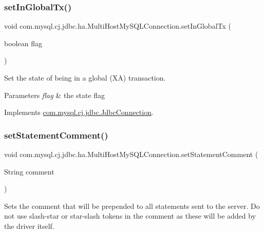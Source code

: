 \subsubsection{\texorpdfstring{set\+In\+Global\+Tx()}{setInGlobalTx()}}
{\footnotesize\ttfamily void com.\+mysql.\+cj.\+jdbc.\+ha.\+Multi\+Host\+My\+S\+Q\+L\+Connection.\+set\+In\+Global\+Tx (\begin{DoxyParamCaption}\item[{boolean}]{flag }\end{DoxyParamCaption})}

Set the state of being in a global (XA) transaction.


\begin{DoxyParams}{Parameters}
{\em flag} & the state flag \\
\hline
\end{DoxyParams}


Implements \mbox{\hyperlink{interfacecom_1_1mysql_1_1cj_1_1jdbc_1_1_jdbc_connection_af7cff3ba67d2b787b04c3eff40f9e087}{com.\+mysql.\+cj.\+jdbc.\+Jdbc\+Connection}}.

\mbox{\label{classcom_1_1mysql_1_1cj_1_1jdbc_1_1ha_1_1_multi_host_my_s_q_l_connection_a4e028eb0c700613a20c0a2b7f8a21170}} 
\subsubsection{\texorpdfstring{set\+Statement\+Comment()}{setStatementComment()}}
{\footnotesize\ttfamily void com.\+mysql.\+cj.\+jdbc.\+ha.\+Multi\+Host\+My\+S\+Q\+L\+Connection.\+set\+Statement\+Comment (\begin{DoxyParamCaption}\item[{String}]{comment }\end{DoxyParamCaption})}

Sets the comment that will be prepended to all statements sent to the server. Do not use slash-\/star or star-\/slash tokens in the comment as these will be added by the driver itself.



